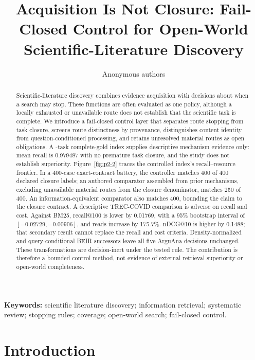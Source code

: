 \documentclass[a4paper,fleqn]{cas-sc}
\title[mode=title]{Acquisition Is Not Closure: Fail-Closed Control for Open-World
Scientific-Literature Discovery}
\author[1]{Anonymous authors}
\date{}
\theoremstyle{definition}
\begin{document}
\maketitle
{}

\begin{abstract}
Scientific-literature discovery combines evidence acquisition with decisions
about when a search may stop. These functions are often evaluated as one policy,
although a locally exhausted or unavailable route does not establish that the
scientific task is complete. We introduce a fail-closed control layer that
separates route stopping from task closure, screens route distinctness by
provenance, distinguishes content identity from question-conditioned processing,
and retains unresolved material routes as open obligations. A
\OfflineTaskCount{}-task complete-gold index supplies descriptive mechanism
evidence only: mean recall is 0.979487 with no premature task closure, and the
study does not establish superiority. Figure~\ref{fig:p2-2} traces the
controlled index's recall--resource frontier. In a 400-case exact-contract
battery, the controller matches 400 of 400 declared closure labels; an authored
comparator assembled from prior mechanisms, excluding unavailable material
routes from the closure denominator, matches 250 of 400. An
information-equivalent comparator also matches 400, bounding the claim to the
closure contract. A descriptive TREC-COVID comparison is adverse on recall and
cost. Against BM25,
recall@100 is lower by 0.01769, with a 95\% bootstrap interval of
$[-0.02729,-0.00906]$, and reads increase by 175.7\%. nDCG@10 is higher by 0.1488; that secondary
result cannot replace the recall and cost criteria. Density-normalized and
query-conditional BEIR successors leave all
five ArguAna decisions unchanged. These transformations are decision-inert
under the tested rule. The contribution is therefore a bounded control method,
not evidence of external retrieval superiority or open-world completeness.
\end{abstract}

\noindent\textbf{Keywords:} scientific literature discovery; information
retrieval; systematic review; stopping rules; coverage; open-world search;
fail-closed control.

\section{Introduction}
\end{document}
